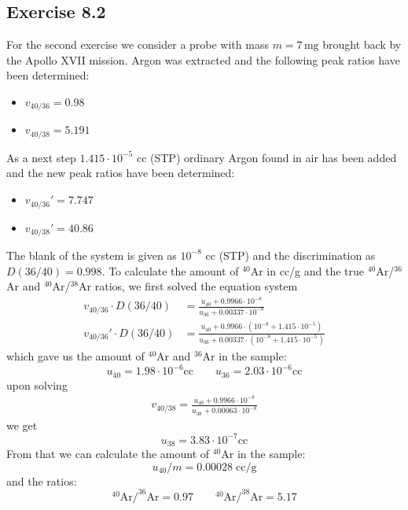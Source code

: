 \subsection{Exercise 8.2}
For the second exercise we consider a probe with mass $m=7 \,\si{\milli\gram}$ brought back by the Apollo XVII mission. Argon was extracted and the following peak ratios have been determined:
\begin{itemize}
    \item $v_{40/36} = 0.98$
    \item $v_{40/38} = 5.191$
\end{itemize}
As a next step $1.415\cdot 10^{-5}$ cc (STP) ordinary Argon found in air has been added and the new peak ratios have been determined:
\begin{itemize}
    \item $v_{40/36}' = 7.747$
    \item $v_{40/38}' = 40.86$
\end{itemize}
The blank of the system is given as $10^{-8}$ cc (STP) and the discrimination as $D(36/40)=0.998$.
To calculate the amount of $^{40}$Ar in cc/g and the true $^{40}$Ar/$^{36}$Ar and $^{40}$Ar/$^{38}$Ar ratios, we first solved the equation system
\begin{align}
    v_{40/36}\cdot D(36/40) &= \frac{u_{40} + 0.9966\cdot 10^{-8}}{u_{36} + 0.00337\cdot 10^{-8}}\\
    v_{40/36}'\cdot D(36/40) &= \frac{u_{40} + 0.9966\cdot(10^{-8} + 1.415 \cdot 10^{-5})}{u_{36} + 0.00337\cdot(10^{-8} + 1.415 \cdot 10^{-5})}
\end{align}
which gave us the amount of $^{40}$Ar and $^{36}$Ar in the sample:
$$ u_{40} = 1.98\cdot10^{-6} \text{cc} \qquad u_{36} = 2.03\cdot10^{-6} \text{cc} $$
upon solving
\begin{align}
    v_{40/38} = \frac{u_{40} + 0.9966\cdot10^{-8}}{u_{38} + 0.00063\cdot10^{-8}}
\end{align}
we get
$$ u_{38} = 3.83\cdot10^{-7} \text{cc} $$
From that we can calculate the amount of $^{40}$Ar in the sample:
$$u_{40}/m = 0.00028 \;\text{cc/g}$$
and the ratios:
$$^{40}\text{Ar}/^{36}\text{Ar} = 0.97 \qquad ^{40}\text{Ar}/^{38}\text{Ar} = 5.17$$

